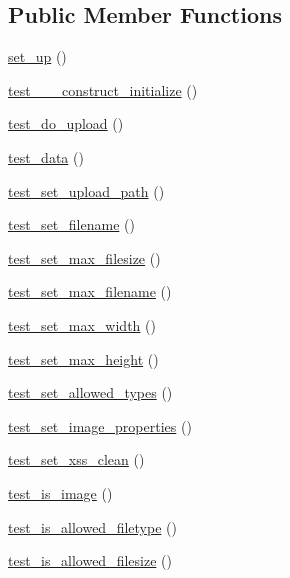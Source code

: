 \subsection*{Public Member Functions}
\begin{DoxyCompactItemize}
\item 
\hyperlink{class_upload__test_a69829875c8d4b6ce94908445c4155741}{set\+\_\+up} ()
\item 
\hyperlink{class_upload__test_afcbf45ee4aeb4f84f947fedb51254ed3}{test\+\_\+\+\_\+\+\_\+construct\+\_\+initialize} ()
\item 
\hyperlink{class_upload__test_aa1e70bcc667a62ac349c7f80176e0131}{test\+\_\+do\+\_\+upload} ()
\item 
\hyperlink{class_upload__test_a631f7fc53282abe67b92eedeb310a731}{test\+\_\+data} ()
\item 
\hyperlink{class_upload__test_ab45fb5023402f0aa588cbd8be42bcf6e}{test\+\_\+set\+\_\+upload\+\_\+path} ()
\item 
\hyperlink{class_upload__test_a7c0fb4d55f660bab7bb887b40aa68907}{test\+\_\+set\+\_\+filename} ()
\item 
\hyperlink{class_upload__test_a60d63a9e8281d8a55f48638ff91de925}{test\+\_\+set\+\_\+max\+\_\+filesize} ()
\item 
\hyperlink{class_upload__test_a1eea169e48a50e8dc13feea930d5e5f7}{test\+\_\+set\+\_\+max\+\_\+filename} ()
\item 
\hyperlink{class_upload__test_abf0cb84450e3a915936d0d53d4ae9c73}{test\+\_\+set\+\_\+max\+\_\+width} ()
\item 
\hyperlink{class_upload__test_a9450e08e4034ccf8d389fe0423abdc40}{test\+\_\+set\+\_\+max\+\_\+height} ()
\item 
\hyperlink{class_upload__test_a933b651325f5f3f74637e63944b58d53}{test\+\_\+set\+\_\+allowed\+\_\+types} ()
\item 
\hyperlink{class_upload__test_a4379f44c61b91e37d8a55aa274eeeac7}{test\+\_\+set\+\_\+image\+\_\+properties} ()
\item 
\hyperlink{class_upload__test_a01587d96f7228a5f17a6a39f3ddd6416}{test\+\_\+set\+\_\+xss\+\_\+clean} ()
\item 
\hyperlink{class_upload__test_ac522552484fc416e6e667b7e701012e5}{test\+\_\+is\+\_\+image} ()
\item 
\hyperlink{class_upload__test_a71c372eff0435dd0fe10fbafc73261b6}{test\+\_\+is\+\_\+allowed\+\_\+filetype} ()
\item 
\hyperlink{class_upload__test_ad20a3dc8239e821f6d0bc306e0064e16}{test\+\_\+is\+\_\+allowed\+\_\+filesize} ()

\end{DoxyCompactItemize}
